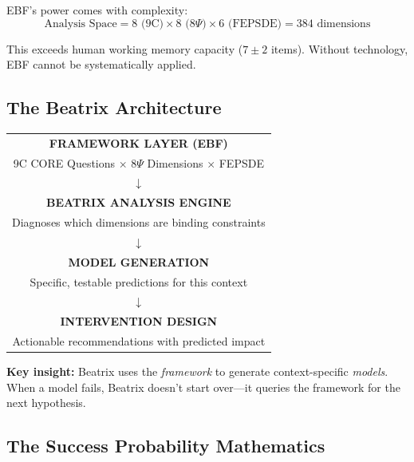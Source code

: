 EBF's power comes with complexity:
\begin{equation}
\text{Analysis Space} = 8 \text{ (9C)} \times 8 \text{ (8$\Psi$)} \times 6 \text{ (FEPSDE)} = 384 \text{ dimensions}
\end{equation}

This exceeds human working memory capacity ($7 \pm 2$ items). Without technology,
EBF cannot be systematically applied.

\subsection{The Beatrix Architecture}

\begin{tcolorbox}[colback=purple!5!white, colframe=purple!75!black,
    title=\textbf{Beatrix: Framework-to-Model Generator}]

\begin{center}
\begin{tabular}{@{}c@{}}
\textbf{FRAMEWORK LAYER (EBF)} \\
9C CORE Questions $\times$ 8$\Psi$ Dimensions $\times$ FEPSDE \\
$\downarrow$ \\
\textbf{BEATRIX ANALYSIS ENGINE} \\
Diagnoses which dimensions are binding constraints \\
$\downarrow$ \\
\textbf{MODEL GENERATION} \\
Specific, testable predictions for this context \\
$\downarrow$ \\
\textbf{INTERVENTION DESIGN} \\
Actionable recommendations with predicted impact \\
\end{tabular}
\end{center}

\textbf{Key insight:} Beatrix uses the \textit{framework} to generate context-specific \textit{models}.
When a model fails, Beatrix doesn't start over---it queries the framework for the next hypothesis.

\end{tcolorbox}

\subsection{The Success Probability Mathematics}


